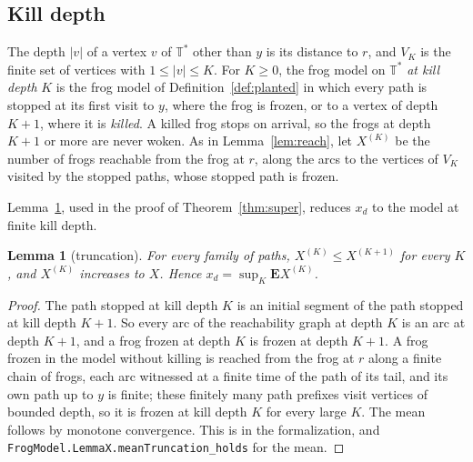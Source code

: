 \documentclass[11pt]{amsart}
\newtheorem{lemma}[theorem]{Lemma}
\theoremstyle{definition}
\numberwithin{equation}{section}
\newcommand{\lean}[1]{\ignorespaces}
\newcommand{\Ts}{\mathbb{T}^{*}}
\newcommand{\E}{\mathbf{E}}
\begin{document}
\subsection{Kill depth}
The depth $|v|$ of a vertex $v$ of $\Ts$ other than $y$ is its distance to $r$, and $V_K$ is the finite set of vertices with $1\le|v|\le K$. For $K\ge0$, the frog model on $\Ts$ \emph{at kill depth} $K$ is the frog model of Definition~\ref{def:planted} in which every path is stopped at its first visit to $y$, where the frog is frozen, or to a vertex of depth $K+1$, where it is \emph{killed}. A killed frog stops on arrival, so the frogs at depth $K+1$ or more are never woken. As in Lemma~\ref{lem:reach}, let $X^{(K)}$ be the number of frogs reachable from the frog at $r$, along the arcs to the vertices of $V_K$ visited by the stopped paths, whose stopped path is frozen.

Lemma~\ref{lem:trunc}, used in the proof of Theorem~\ref{thm:super}, reduces $x_d$ to the model at finite kill depth.

\begin{lemma}[truncation]\label{lem:trunc}\lean{FrogModel.LemmaX.truncation_holds, FrogModel.LemmaX.meanTruncation_holds, FrogModel.LemmaX.Truncation, FrogModel.LemmaX.MeanTruncation, FrogModel.LemmaX.frozenCountK}
For every family of paths, $X^{(K)}\le X^{(K+1)}$ for every $K$, and $X^{(K)}$ increases to $X$. Hence $x_d=\sup_K\E X^{(K)}$.
\end{lemma}

\begin{proof}
The path stopped at kill depth $K$ is an initial segment of the path stopped at kill depth $K+1$. So every arc of the reachability graph at depth $K$ is an arc at depth $K+1$, and a frog frozen at depth $K$ is frozen at depth $K+1$. A frog frozen in the model without killing is reached from the frog at $r$ along a finite chain of frogs, each arc witnessed at a finite time of the path of its tail, and its own path up to $y$ is finite; these finitely many path prefixes visit vertices of bounded depth, so it is frozen at kill depth $K$ for every large $K$. The mean follows by monotone convergence. This is  in the formalization, and \texttt{FrogModel.LemmaX.meanTruncation\_holds} for the mean.
\end{proof}
\end{document}
